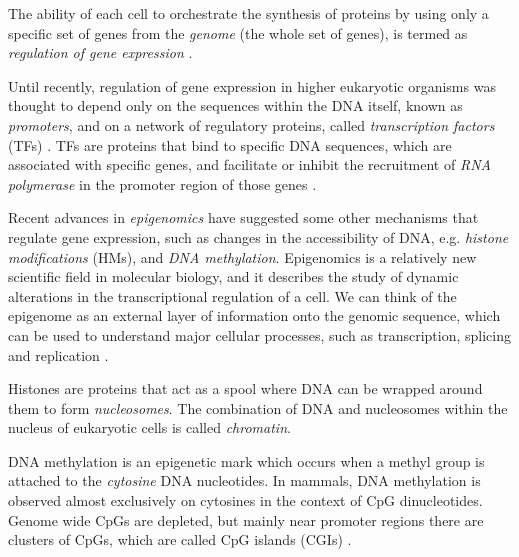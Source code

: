 The ability of each cell to orchestrate the synthesis of proteins by using only a specific set of genes from the \emph{genome} (\ie the whole set of genes), is termed as \emph{regulation of gene expression} \citep{Jasny2001}.

Until recently, regulation of gene expression in higher eukaryotic organisms was thought to depend only on the sequences within the DNA itself, known as \emph{promoters}, and on a network of regulatory proteins, called \emph{transcription factors} (TFs) \citep{Jasny2001}. TFs are proteins that bind to specific DNA sequences, which are associated with specific genes, and facilitate or inhibit the recruitment of \emph{RNA polymerase} in the promoter region of those genes \citep{Ptashne2002}. 

Recent advances in \emph{epigenomics} have suggested some other mechanisms that regulate gene expression, such as changes in the accessibility of DNA, e.g. \emph{histone modifications} (HMs), and \emph{DNA methylation}. Epigenomics is a relatively new scientific field in molecular biology, and it describes the study of dynamic alterations in the transcriptional regulation of a cell. We can think of the epigenome as an external layer of information onto the genomic sequence, which can be used to understand major cellular processes, such as transcription, splicing and replication \citep{Furey2012}.

Histones are proteins that act as a spool where DNA can be wrapped around them to form \emph{nucleosomes}. The combination of DNA and nucleosomes within the nucleus of eukaryotic cells is called \emph{chromatin}. 

DNA methylation is an epigenetic mark which occurs when a methyl group is attached to the \emph{cytosine} DNA nucleotides. In mammals, DNA methylation is observed almost exclusively on cytosines in the context of CpG dinucleotides. Genome wide CpGs are depleted, but mainly near promoter regions there are clusters of CpGs, which are called CpG islands (CGIs) \citep{Bird2002,Illingworth2009}. 

